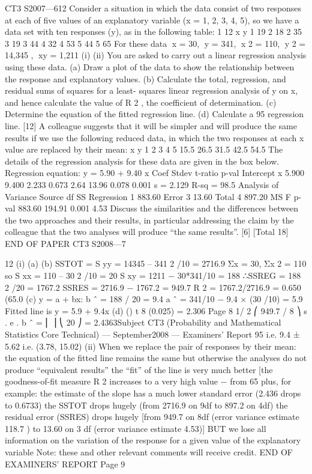 CT3 S2007—612
Consider a situation in which the data consist of two responses at each of five values
of an explanatory variable (x = 1, 2, 3, 4, 5), so we have a data set with ten responses
(y), as in the following table:
1
12
x
y
1
19
2
18
2
35
3
19
3
44
4
32
4
53
5
44
5
65
For these data x = 30, y = 341, x 2 = 110, y 2 = 14,345 , xy = 1,211
(i)
(ii)
You are asked to carry out a linear regression analysis using these data.
(a) Draw a plot of the data to show the relationship between the response
and explanatory values.
(b) Calculate the total, regression, and residual sums of squares for a least-
squares linear regression analysis of y on x, and hence calculate the
value of R 2 , the coefficient of determination.
(c) Determine the equation of the fitted regression line.
(d) Calculate a 95%
regression line.
[12]
A colleague suggests that it will be simpler and will produce the same results
if we use the following reduced data, in which the two responses at each x
value are replaced by their mean:
x
y
1
2
3
4
5
15.5 26.5 31.5 42.5 54.5
The details of the regression analysis for these data are given in the box below.
Regression equation: y = 5.90 + 9.40 x
Coef Stdev t-ratio p-val
Intercept
x 5.900
9.400 2.233
0.673 2.64
13.96 0.078
0.001
s = 2.129 R-sq = 98.5%
Analysis of Variance
Source
df
SS
Regression 1 883.60
Error
3
13.60
Total
4 897.20
MS
F
p-val
883.60 194.91 0.001
4.53
Discuss the similarities and the differences between the two approaches and their
results, in particular addressing the claim by the colleague that the two analyses will
produce “the same results”.
[6]
[Total 18]
END OF PAPER
CT3 S2008—7

12
(i)
(a)
(b)
SSTOT = S yy = 14345 – 341 2 /10 = 2716.9
Σx = 30, Σx 2 = 110 so S xx = 110 – 30 2 /10 = 20
S xy = 1211 − 30*341/10 = 188
∴SSREG = 188 2 /20 = 1767.2
SSRES = 2716.9 − 1767.2 = 949.7
R 2 = 1767.2/2716.9 = 0.650 (65.0%
(c)
y = a + bx:
b ˆ = 188 / 20 = 9.4
a ˆ = 341/10 − 9.4 × (30 /10) = 5.9
Fitted line is y = 5.9 + 9.4x
(d)
()
t 8 (0.025) = 2.306
Page 8
1/ 2
⎛ 949.7 / 8 ⎞
s . e . b ˆ = ⎜
⎟
⎝ 20 ⎠
= 2.4363Subject CT3 (Probability and Mathematical Statistics Core Technical) — September2008 — Examiners’ Report
95%
i.e. 9.4 ± 5.62 i.e. (3.78, 15.02)
(ii)
When we replace the pair of responses by their mean:
the equation of the fitted line remains the same
but otherwise the analyses do not produce “equivalent results”
the “fit” of the line is very much better [the goodness-of-fit measure R 2 increases
to a very high value − from 65%
plus, for example:
the estimate of the slope has a much lower standard error (2.436 drops to 0.6733)
the SSTOT drops hugely (from 2716.9 on 9df to 897.2 on 4df)
the residual error (SSRES) drops hugely [from 949.7 on 8df (error variance
estimate 118.7 ) to 13.60 on 3 df (error variance estimate 4.53)]
BUT we lose all information on the variation of the response for a given value of
the explanatory variable
Note: these and other relevant comments will receive credit.
END OF EXAMINERS’ REPORT
Page 9
